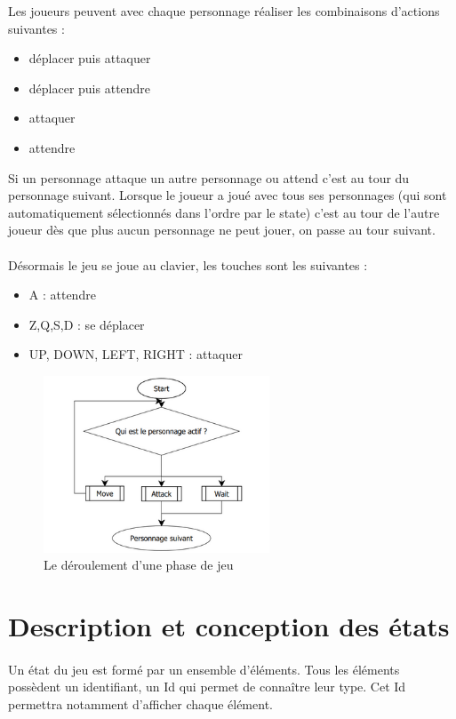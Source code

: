 \documentclass[a4paper,12pt]{article}
\begin{document}
Les joueurs peuvent avec chaque personnage réaliser les combinaisons d'actions suivantes : 
\begin{itemize}
\item déplacer puis attaquer 
\item déplacer puis attendre
\item attaquer
\item attendre
\end{itemize}

Si un personnage attaque un autre personnage ou attend c'est au tour du personnage suivant. 
Lorsque le joueur a joué avec tous ses personnages (qui sont automatiquement sélectionnés dans l'ordre par le state) c'est au tour de l'autre joueur dès que plus aucun personnage ne peut jouer, on passe au tour suivant. 

\paragraph{} 
Désormais le jeu se joue au clavier, les touches sont les suivantes :
\begin{itemize}
\item A : attendre
\item Z,Q,S,D : se déplacer
\item UP, DOWN, LEFT, RIGHT : attaquer
\end{itemize}
\begin{figure}[ht]
\begin{center}
\includegraphics[width=0.6\textwidth]{phase.png}
\caption{Le déroulement d’une phase de jeu}
\end{center}
\end{figure}
\clearpage
\section{Description et conception des états}
\paragraph{} Un état du jeu est formé par un ensemble d’éléments. Tous les éléments possèdent un identifiant, un Id qui permet de connaître leur type. Cet Id permettra notamment d'afficher chaque élément.
\end{document}
